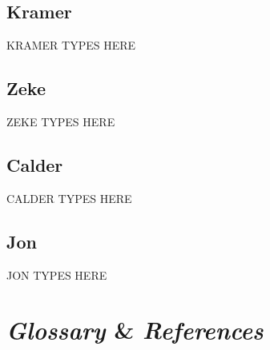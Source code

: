 \documentclass[12pt]{article}
\begin{document}
\subsection{Kramer}
\begin{changemargin}{1cm}{0cm} 
KRAMER TYPES HERE
\end{changemargin} 
\subsection{Zeke}
\begin{changemargin}{1cm}{0cm} 
ZEKE TYPES HERE
\end{changemargin} 
\subsection{Calder}
\begin{changemargin}{1cm}{0cm} 
CALDER TYPES HERE
\end{changemargin} 
\subsection{Jon}
\begin{changemargin}{1cm}{0cm} 
JON TYPES HERE
\end{changemargin} 


\section{\emph{Glossary} \& \emph{References}}
	
\end{document}

